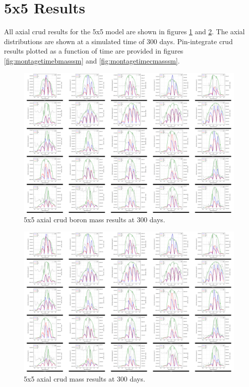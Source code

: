 
\section{5x5 Results}

All axial crud results for the 5x5 model are shown in figures \ref{fig:montageaxialbmasssm} and \ref{fig:montageaxialcmasssm}.  The axial distributions are shown at a simulated time of 300 days. Pin-integrate crud results plotted as a function of time are provided in figures \ref{fig:montagetimebmasssm} and \ref{fig:montagetimecmasssm}.

\begin{landscape}
\begin{figure}[H]
    \centering
    \includegraphics[width=.9\linewidth]{figs/5x5/imp/montage_axial_bmass_sm}
    \caption{5x5 axial crud boron mass results at 300 days.}
    \label{fig:montageaxialbmasssm}
\end{figure}
\begin{figure}[H]
    \centering
    \includegraphics[width=.9\linewidth]{figs/5x5/imp/montage_axial_cmass_sm}
    \caption{5x5 axial crud mass results at 300 days.}
    \label{fig:montageaxialcmasssm}
\end{figure}


\end{landscape}
